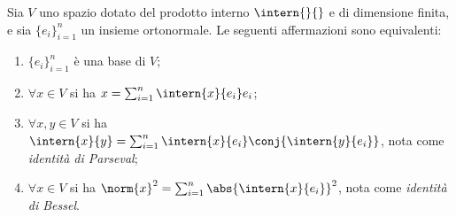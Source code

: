 \begin{teorema} \label{t:identita-parseval-bessel}
	Sia $V$ uno spazio dotato del prodotto interno $\intern{}{}$ e di dimensione finita, e sia $\{  e_i\}_{i=1}^n$ un insieme ortonormale.
	Le seguenti affermazioni sono equivalenti:
	\begin{enumerate}
		\item $\{  e_i\}_{i=1}^n$ è una base di $V$;
		\item $\forall  x\in V$ si ha $  x=\sum_{i=1}^n\intern{  x}{  e_i}  e_i$;
		\item $\forall  x,  y\in V$ si ha $\intern{  x}{  y}=\sum_{i=1}^n\intern{  x}{  e_i}\conj{\intern{  y}{  e_i}}$, nota come \emph{identità di Parseval};
		\item $\forall  x\in V$ si ha $\norm{  x}^2=\sum_{i=1}^n\abs{\intern{  x}{  e_i}}^2$, nota come \emph{identità di Bessel}.
	\end{enumerate}
\end{teorema}
